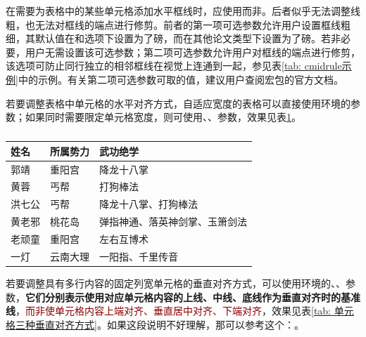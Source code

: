 \documentclass[doctor, vlined, ]{DissertUESTC}
\begin{document}
	在需要为表格中的某些单元格添加水平框线时，应使用\newline{}而非。后者似乎无法调整线粗，也无法对框线的端点进行修剪。前者的第一项可选参数允许用户设置框线粗细，其默认值在和选项下设置为了磅，而在其他论文类型下设置为了磅。若非必要，用户无需设置该可选参数；第二项可选参数允许用户对框线的端点进行修剪，该选项可防止同行独立的相邻框线在视觉上连通到一起，参见表\ref{tab: cmidrule示例}中的示例。有关第二项可选参数可取的值，建议用户查阅\href{https://mirrors.sustech.edu.cn/CTAN/macros/latex/contrib/booktabs/booktabs.pdf}{\ttfamily\color{DarkRed}}宏包的官方文档。
	
	若要调整表格中单元格的水平对齐方式，自适应宽度的表格可以直接使用环境的参数；如果同时需要限定单元格宽度，则可使用、、参数，效果见表\ref{tab: 单元格三种水平对齐方式}。

	\begin{table}[!ht]
		\caption{} \label{tab: 单元格三种水平对齐方式}
		\begin{tabular}{p{2cm} p{3cm}<{\centering} p{7cm}<{\raggedleft}}
			\toprule
			\textbf{姓名} & \textbf{所属势力} & \textbf{武功绝学} \\
			\midrule
			郭靖 & 重阳宫 & 降龙十八掌 \\
			黄蓉 & 丐帮 & 打狗棒法 \\
			洪七公 & 丐帮 & 降龙十八掌、打狗棒法 \\
			黄老邪 & 桃花岛 & 弹指神通、落英神剑掌、玉箫剑法 \\
			老顽童 & 重阳宫 & 左右互博术 \\
			一灯 & 云南大理 & 一阳指、千里传音 \\
			\bottomrule
		\end{tabular}
	\end{table}

	若要调整具有多行内容的固定列宽单元格的垂直对齐方式，可以使用环境的、、参数，\textbf{它们分别表示使用对应单元格内容的上线、中线、底线作为垂直对齐时的基准线}，\textcolor{DarkRed}{而非使单元格内容上端对齐、垂直居中对齐、下端对齐}，效果见表\ref{tab: 单元格三种垂直对齐方式}。如果这段说明不好理解，那可以参考这个：\href{https://tex.stackexchange.com/questions/35293}{\ttfamily\color{DarkRed}}。
\end{document}
